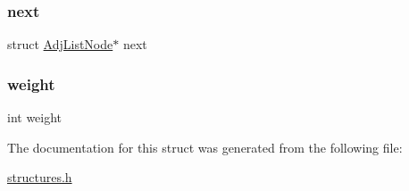\subsubsection{\texorpdfstring{next}{next}}
{\footnotesize\ttfamily struct \mbox{\hyperlink{struct_adj_list_node}{Adj\+List\+Node}}$\ast$ next}

\mbox{\label{struct_adj_list_node_aa01147b1f07072d246c76dc85d69df7c}} 
\subsubsection{\texorpdfstring{weight}{weight}}
{\footnotesize\ttfamily int weight}



The documentation for this struct was generated from the following file\+:\begin{DoxyCompactItemize}
\item 
\mbox{\hyperlink{structures_8h}{structures.\+h}}\end{DoxyCompactItemize}
